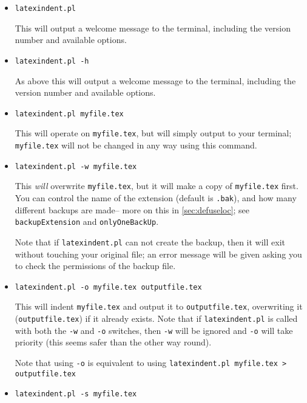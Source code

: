\begin{itemize}[labelsep=.5cm]
	\item[] \lstinline!latexindent.pl!
													
	This will output a welcome message to the terminal, including the version number
	and available options.
	\item[\verbitem{-h}] \lstinline!latexindent.pl -h!
													
	As above this will output a welcome message to the terminal, including the version number
	and available options.
	\item[] \lstinline!latexindent.pl myfile.tex!
														 		 		 		 		 					
	This will operate on \lstinline!myfile.tex!, but will simply output to your terminal; \lstinline!myfile.tex! will	not be changed in any way using this command. 
	\item[\verbitem{-w}] \lstinline!latexindent.pl -w myfile.tex!
														 		 		 		 		 					
	This \emph{will} overwrite \lstinline!myfile.tex!, but it will
	make a copy of \lstinline!myfile.tex! first. You can control the name of 
	the extension (default is \lstinline!.bak!), and how many different backups are made-- 
	more on this in \cref{sec:defuseloc}; see \lstinline!backupExtension! and \lstinline!onlyOneBackUp!.
														 		 		 		 		 					
	Note that if \lstinline!latexindent.pl! can not create the backup, then it 
	will exit without touching your original file; an error message will be given
	asking you to check the permissions of the backup file.
	\item[\verbitem{-o}] \lstinline!latexindent.pl -o myfile.tex outputfile.tex!
														 		 		 		 		 					
	This will indent \lstinline!myfile.tex! and output it to \lstinline!outputfile.tex!, 
	overwriting it (\lstinline!outputfile.tex!) if it already exists. Note that if \lstinline!latexindent.pl! is called with both
	the \lstinline!-w! and \lstinline!-o! switches, then \lstinline!-w! will
	be ignored and \lstinline!-o! will take priority (this seems safer than the 
	other way round).
														 		 		 		 		 					
	Note that using \lstinline!-o! is equivalent to using \lstinline!latexindent.pl myfile.tex > outputfile.tex!
	\item[\verbitem{-s}] \lstinline!latexindent.pl -s myfile.tex!
														 		 		 		 		 					

\end{itemize}
